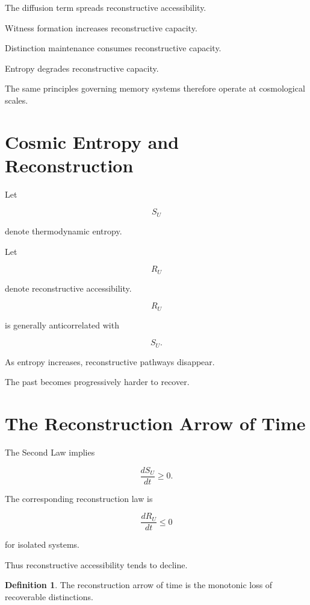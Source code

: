 \documentclass[12pt,oneside]{book}
\theoremstyle{plain} \newtheorem{theorem}{Theorem}[chapter] \newtheorem{lemma}[theorem]{Lemma} \newtheorem{proposition}[theorem]{Proposition} \newtheorem{corollary}[theorem]{Corollary}
\theoremstyle{definition} \newtheorem{definition}[theorem]{Definition} \newtheorem{axiom}[theorem]{Axiom} \newtheorem{construction}[theorem]{Construction}
\theoremstyle{remark} \newtheorem{remark}[theorem]{Remark} \newtheorem{example}[theorem]{Example}
\begin{document}
The diffusion term spreads reconstructive accessibility.

Witness formation increases reconstructive capacity.

Distinction maintenance consumes reconstructive capacity.

Entropy degrades reconstructive capacity.

The same principles governing memory systems therefore operate at cosmological scales.

\section{Cosmic Entropy and Reconstruction}

Let

\[
S_U
\]

denote thermodynamic entropy.

Let

\[
R_U
\]

denote reconstructive accessibility.

\begin{conjecture}

\[
R_U
\]

is generally anticorrelated with

\[
S_U.
\]

\end{conjecture}

As entropy increases, reconstructive pathways disappear.

The past becomes progressively harder to recover.

\section{The Reconstruction Arrow of Time}

The Second Law implies

\[
\frac{dS_U}{dt}
\ge
0.
\]

The corresponding reconstruction law is

\[
\frac{dR_U}{dt}
\le
0
\]

for isolated systems.

Thus reconstructive accessibility tends to decline.

\begin{definition}

The reconstruction arrow of time is the monotonic loss of recoverable distinctions.

\end{definition}
\end{document}
